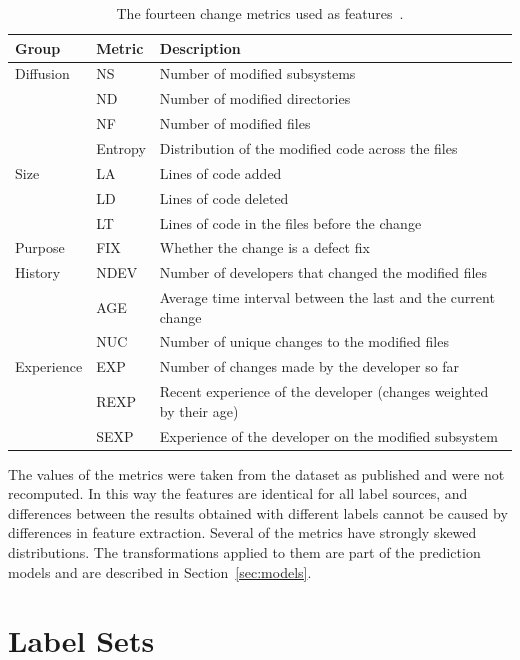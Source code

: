 \documentclass[12pt,a4paper,oneside]{report}
\begin{document}
\begin{table}[htbp]
\centering\small
\caption{The fourteen change metrics used as features~\cite{kamei2013jit}.}
\label{tab:metrics}
\begin{tabularx}{\linewidth}{@{}llX@{}}
\toprule
Group & Metric & Description \\
\midrule
Diffusion & NS & Number of modified subsystems \\
 & ND & Number of modified directories \\
 & NF & Number of modified files \\
 & Entropy & Distribution of the modified code across the files \\
\midrule
Size & LA & Lines of code added \\
 & LD & Lines of code deleted \\
 & LT & Lines of code in the files before the change \\
\midrule
Purpose & FIX & Whether the change is a defect fix \\
\midrule
History & NDEV & Number of developers that changed the modified files \\
 & AGE & Average time interval between the last and the current change \\
 & NUC & Number of unique changes to the modified files \\
\midrule
Experience & EXP & Number of changes made by the developer so far \\
 & REXP & Recent experience of the developer (changes weighted by their age) \\
 & SEXP & Experience of the developer on the modified subsystem \\
\bottomrule
\end{tabularx}
\end{table}

The values of the metrics were taken from the dataset as published and were
not recomputed. In this way the features are identical for all label sources,
and differences between the results obtained with different labels cannot be
caused by differences in feature extraction. Several of the metrics have
strongly skewed distributions. The transformations applied to them are part
of the prediction models and are described in Section~\ref{sec:models}.

\section{Label Sets}
\end{document}
